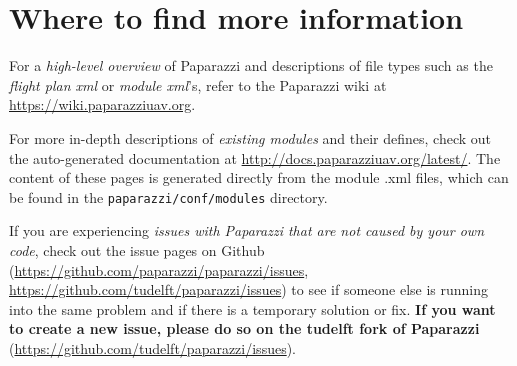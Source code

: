 \documentclass{article}
\begin{document}
\section{Where to find more information}
For a \emph{high-level overview} of Paparazzi and descriptions of file types such as the \emph{flight plan xml} or \emph{module xml}'s, refer to the Paparazzi wiki at \url{https://wiki.paparazziuav.org}.

For more in-depth descriptions of \emph{existing modules} and their defines, check out the auto-generated documentation at \url{http://docs.paparazziuav.org/latest/}. The content of these pages is generated directly from the module .xml files, which can be found in the \texttt{paparazzi/conf/modules} directory.

If you are experiencing \emph{issues with Paparazzi that are not caused by your own code}, check out the issue pages on Github (\url{https://github.com/paparazzi/paparazzi/issues}, \url{https://github.com/tudelft/paparazzi/issues}) to see if someone else is running into the same problem and if there is a temporary solution or fix.
\textbf{If you want to create a new issue, please do so on the tudelft fork of Paparazzi} (\url{https://github.com/tudelft/paparazzi/issues}).
\end{document}
